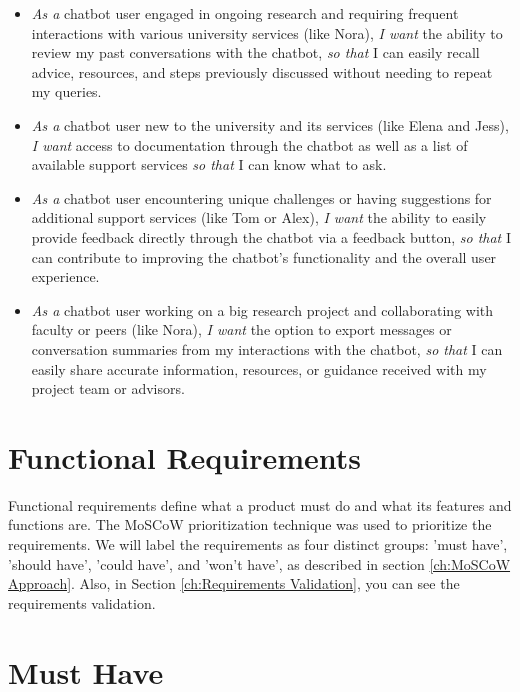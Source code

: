 \documentclass{l4proj}
\begin{document}
\begin{itemize}
    \item \textit{As a} chatbot user engaged in ongoing research and requiring frequent interactions with various university services (like Nora), \textit{I want} the ability to review my past conversations with the chatbot, \textit{so that} I can easily recall advice, resources, and steps previously discussed without needing to repeat my queries.

    \item \textit{As a} chatbot user new to the university and its services (like Elena and Jess), \textit{I want} access to documentation through the chatbot as well as a list of available support services \textit{so that} I can know what to ask.

    \item \textit{As a} chatbot user encountering unique challenges or having suggestions for additional support services (like Tom or Alex), \textit{I want} the ability to easily provide feedback directly through the chatbot via a feedback button, \textit{so that} I can contribute to improving the chatbot's functionality and the overall user experience.

    \item \textit{As a} chatbot user working on a big research project and collaborating with faculty or peers (like Nora), \textit{I want} the option to export messages or conversation summaries from my interactions with the chatbot, \textit{so that} I can easily share accurate information, resources, or guidance received with my project team or advisors.
    
\end{itemize}



\section{Functional Requirements}

Functional requirements define what a product must do and what its features and functions are. The MoSCoW prioritization technique was used to prioritize the requirements. We will label the requirements as four distinct groups: 'must have', 'should have', 'could have', and 'won't have', as described in section \ref{ch:MoSCoW Approach}. Also, in Section \ref{ch:Requirements Validation}, you can see the requirements validation.

\section*{\textbf{Must Have}}
\end{document}
